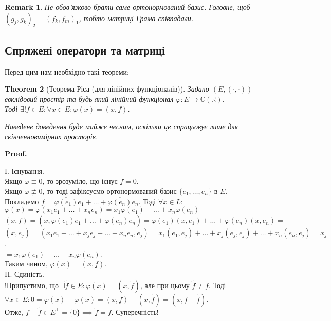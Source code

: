 \documentclass[a4paper, 10pt]{article}
\makeatletter
\def\qed{$\blacksquare$}
\theoremstyle{theoremdd}
\newtheorem{theorem}{Theorem}[subsection]
\theoremstyle{theoremdd}
\theoremstyle{theoremdd}
\theoremstyle{theoremdd}
\theoremstyle{theoremdd}
\theoremstyle{theoremdd}
\newtheorem{remark}[theorem]{Remark}
\theoremstyle{theoremdd}
\theoremstyle{theoremdd}
\renewenvironment{proof}[1][Proof.\\]{\par
\pushQED{\hfill \qed}%
\normalfont \topsep6\p@\@plus6\p@\relax
\trivlist
\item\relax
{\bfseries
#1\@addpunct{.}}\hspace\labelsep\ignorespaces
}{%
\popQED\endtrivlist\@endpefalse
}
\makeatother
\begin{document}
\begin{remark}
Не обов'язково брати саме ортонормований базис. Головне, щоб $(g_j,g_k)_2 = (f_k,f_m)_1$, тобто матриці Грама співпадали.
\end{remark}

\subsection{Спряжені оператори та матриці}
Перед цим нам необхідно такі теореми:
\begin{theorem}[Теорема Ріса (для лінійних функціоналів)]
Задано $(E,(\cdot,\cdot))$ - евклідовий простір та будь-який лінійний функціонал $\varphi: E \to \mathbb{C} (\mathbb{R})$. \\ Тоді $\exists ! f \in E: \forall x \in E: \varphi(x) = (x,f)$.
\end{theorem}

\textit{Наведене доведення буде майже чесним, оскільки це спрацьовує лише для скінченновимірних просторів.}

\begin{proof}
I. Існування.\\
Якщо $\varphi \equiv 0$, то зрозуміло, що існує $f = 0$.\\
Якщо $\varphi \not\equiv 0$, то тоді зафіксуємо ортонормований базис $\{e_1,\dots,e_n\}$ в $E$. \\
Покладемо $f = \overline{\varphi(e_1)}e_1 + \dots + \overline{\varphi(e_n)}e_n$. Тоді $\forall x \in L:$\\
$\varphi(x) = \varphi(x_1 e_1+\dots+x_n e_n) = x_1 \varphi(e_1) + \dots + x_n \varphi(e_n)$\\
$(x,f) = (x,\overline{\varphi(e_1)}e_1 + \dots + \overline{\varphi(e_n)}e_n) = \varphi(e_1) (x,e_1) + \dots + \varphi(e_n)(x,e_n) \boxed{=}$\\
$(x,e_j) = (x_1 e_1 + \dots + x_j e_j + \dots + x_n e_n, e_j) = x_1 (e_1,e_j) + \dots + x_j (e_j,e_j) + \dots + x_n (e_n,e_j) = x_j$.\\
$\boxed{=} x_1 \varphi(e_1) + \dots + x_n \varphi(e_n)$.\\
Таким чином, $\varphi(x) = (x,f)$.
\bigskip \\
II. Єдиність.\\
!Припустимо, що $\exists \tilde{f} \in E: \varphi(x) = (x,\tilde{f})$, але при цьому $\tilde{f} \neq f$. Тоді\\
$\forall x \in E: 0 = \varphi(x) - \varphi(x) = (x,f) - (x,\tilde{f}) = (x,f-\tilde{f})$.\\
Отже, $f-\tilde{f} \in E^\perp = \{0\} \implies \tilde{f} = f$. Суперечність!
\end{proof}
\end{document}
